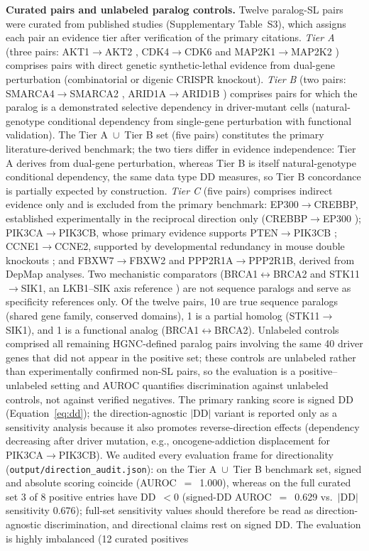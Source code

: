 \documentclass[11pt,a4paper]{article}
\begin{document}
\textbf{Curated pairs and unlabeled paralog controls.} Twelve paralog-SL pairs were curated from published studies (Supplementary Table~S3), which assigns each pair an evidence tier after verification of the primary citations. \textit{Tier A} (three pairs: AKT1$\rightarrow$AKT2 \cite{Najm2018}, CDK4$\rightarrow$CDK6 and MAP2K1$\rightarrow$MAP2K2 \cite{Parrish2021}) comprises pairs with direct genetic synthetic-lethal evidence from dual-gene perturbation (combinatorial or digenic CRISPR knockout). \textit{Tier B} (two pairs: SMARCA4$\rightarrow$SMARCA2 \cite{Hoffman2014}, ARID1A$\rightarrow$ARID1B \cite{Helming2014}) comprises pairs for which the paralog is a demonstrated selective dependency in driver-mutant cells (natural-genotype conditional dependency from single-gene perturbation with functional validation). The Tier A~$\cup$~Tier B set (five pairs) constitutes the primary literature-derived benchmark; the two tiers differ in evidence independence: Tier A derives from dual-gene perturbation, whereas Tier B is itself natural-genotype conditional dependency, the same data type DD measures, so Tier B concordance is partially expected by construction. \textit{Tier C} (five pairs) comprises indirect evidence only and is excluded from the primary benchmark: EP300$\rightarrow$CREBBP, established experimentally in the reciprocal direction only (CREBBP$\rightarrow$EP300 \cite{Ogiwara2016,Nie2021}); PIK3CA$\rightarrow$PIK3CB, whose primary evidence supports PTEN$\rightarrow$PIK3CB \cite{Wee2008}; CCNE1$\rightarrow$CCNE2, supported by developmental redundancy in mouse double knockouts \cite{Geng2003}; and FBXW7$\rightarrow$FBXW2 and PPP2R1A$\rightarrow$PPP2R1B, derived from DepMap analyses. Two mechanistic comparators (BRCA1$\leftrightarrow$BRCA2 \cite{Bryant2005} and STK11$\rightarrow$SIK1, an LKB1--SIK axis reference \cite{Hollstein2019}) are not sequence paralogs and serve as specificity references only. Of the twelve pairs, 10 are true sequence paralogs (shared gene family, conserved domains), 1 is a partial homolog (STK11$\rightarrow$SIK1), and 1 is a functional analog (BRCA1$\leftrightarrow$BRCA2). Unlabeled controls comprised all remaining HGNC-defined paralog pairs involving the same 40 driver genes that did not appear in the positive set; these controls are unlabeled rather than experimentally confirmed non-SL pairs, so the evaluation is a positive--unlabeled setting and AUROC quantifies discrimination against unlabeled controls, not against verified negatives. The primary ranking score is signed DD (Equation~\ref{eq:dd}); the direction-agnostic $|$DD$|$ variant is reported only as a sensitivity analysis because it also promotes reverse-direction effects (dependency decreasing after driver mutation, e.g., oncogene-addiction displacement for PIK3CA$\rightarrow$PIK3CB). We audited every evaluation frame for directionality (\texttt{output/direction\_audit.json}): on the Tier A~$\cup$~Tier B benchmark set, signed and absolute scoring coincide (AUROC~$=$~1.000), whereas on the full curated set 3 of 8 positive entries have DD~$<0$ (signed-DD AUROC~$=$~0.629 vs.\ $|$DD$|$ sensitivity 0.676); full-set sensitivity values should therefore be read as direction-agnostic discrimination, and directional claims rest on signed DD. The evaluation is highly imbalanced (12 curated positives 
\end{document}
